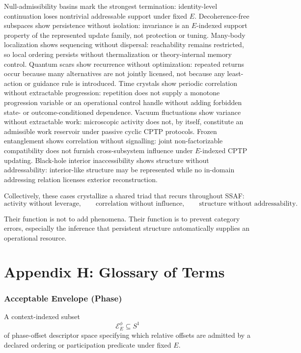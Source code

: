 \documentclass[aps,prx,onecolumn,11pt]{revtex4-2}
\theoremstyle{plain}
\theoremstyle{definition}
\theoremstyle{remark}
\begin{document}
Null-admissibility basins mark the strongest termination:
identity-level continuation loses nontrivial addressable support under
fixed \(E\). Decoherence-free subspaces show persistence without
isolation: invariance is an \(E\)-indexed support property of the
represented update family, not protection or tuning. Many-body
localization shows sequencing without dispersal: reachability remains
restricted, so local ordering persists without thermalization or
theory-internal memory control. Quantum scars show recurrence without
optimization: repeated returns occur because many alternatives are not
jointly licensed, not because any least-action or guidance rule is
introduced. Time crystals show periodic correlation without extractable
progression: repetition does not supply a monotone progression variable
or an operational control handle without adding forbidden state- or
outcome-conditioned dependence. Vacuum fluctuations show variance
without extractable work: microscopic activity does not, by itself,
constitute an admissible work reservoir under passive cyclic CPTP
protocols. Frozen entanglement shows correlation without signalling:
joint non-factorizable compatibility does not furnish cross-subsystem
influence under \(E\)-indexed CPTP updating. Black-hole interior
inaccessibility shows structure without addressability: interior-like
structure may be represented while no in-domain addressing relation
licenses exterior reconstruction.

Collectively, these cases crystallize a shared triad that recurs
throughout SSAF:
\[
\text{activity without leverage},
\qquad
\text{correlation without influence},
\qquad
\text{structure without addressability}.
\]

Their function is not to add phenomena. Their function is to prevent
category errors, especially the inference that persistent structure
automatically supplies an operational resource.

\section{Appendix H: Glossary of Terms}
\label{app:glossary}

\subsubsection*{Acceptable Envelope (Phase)}

A context-indexed subset
\[
\mathcal E^\phi_E\subseteq S^1
\]
of phase-offset descriptor space specifying which relative offsets are
admitted by a declared ordering or participation predicate under fixed
\(E\).
\end{document}
